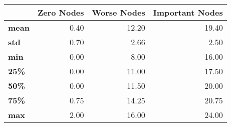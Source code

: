 \begin{tabular}{lrrr}
\toprule
{} &  Zero Nodes &  Worse Nodes &  Important Nodes \\
\midrule
\textbf{mean} &        0.40 &        12.20 &            19.40 \\
\textbf{std } &        0.70 &         2.66 &             2.50 \\
\textbf{min } &        0.00 &         8.00 &            16.00 \\
\textbf{25\% } &        0.00 &        11.00 &            17.50 \\
\textbf{50\% } &        0.00 &        11.50 &            20.00 \\
\textbf{75\% } &        0.75 &        14.25 &            20.75 \\
\textbf{max } &        2.00 &        16.00 &            24.00 \\
\bottomrule
\end{tabular}
